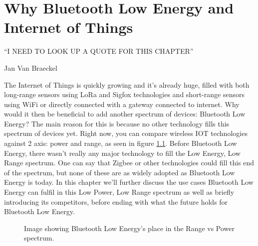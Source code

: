 \documentclass[pdftex,a4paper,12pt,twoside]{report}
\begin{document}
\chapter{Why Bluetooth Low Energy and Internet of Things}
\label{ch:BLEIOT}
\epigraph{``I NEED TO LOOK UP A QUOTE FOR THIS CHAPTER''}{Jan Van Braeckel}
The Internet of Things is quickly growing and it's already huge, filled with both long-range sensors using LoRa and Sigfox technologies and short-range sensors using WiFi or directly connected with a gateway connected to internet. Why would it then be beneficial to add another spectrum of devices: Bluetooth Low Energy? The main reason for this is because no other technology fills this spectrum of devices yet. Right now, you can compare wireless IOT technologies against 2 axis: power and range, as seen in figure \ref{fig:powerrange}. Before Bluetooth Low Energy, there wasn't really any major technology to fill the Low Energy, Low Range spectrum. One can say that Zigbee or other technologies could fill this end of the spectrum, but none of these are as widely adopted as Bluetooth Low Energy is today. In this chapter we'll further discuss the use cases Bluetooth Low Energy can fulfil in this Low Power, Low Range spectrum as well as briefly introducing its competitors, before ending with what the future holds for Bluetooth Low Energy.

\begin{figure}[h]
\centering
{} 

\caption{Image showing Bluetooth Low Energy's place in the Range vs Power spectrum.}
\label{fig:powerrange}

\end{figure}
\end{document}
